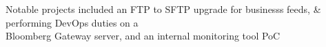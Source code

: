 \begin{cventries}
{\begin{cvitems}
        \item {Notable projects included an FTP to SFTP upgrade for businesss feeds, \& performing DevOps duties on a \\Bloomberg Gateway server, and an internal monitoring tool PoC}
      \end{cvitems}
    }
\end{cventries}
